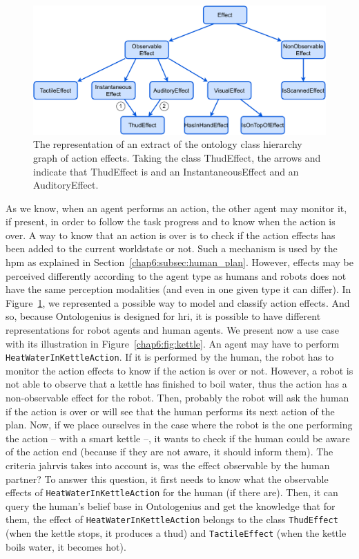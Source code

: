 \documentclass[a4paper,11pt,twoside]{StyleThese}
\begin{document}
\begin{figure}[!ht]
	\includegraphics[width=\linewidth]{figures/chapter2/class_effects.pdf}
	\caption{The representation of an extract of the ontology class hierarchy graph of action effects. Taking the class ThudEffect, the arrows  and  indicate that ThudEffect is and an InstantaneousEffect and an AuditoryEffect.}
	\label{chap6:fig:class_effects}
\end{figure}

As we know, when an agent performs an action, the other agent may monitor it, if present, in order to follow the task progress and to know when the action is over. A way to know that an action is over is to check if the action effects has been added to the current worldstate or not. Such a mechanism is used by the \acrlong{hpm} as explained in Section~\ref{chap6:subsec:human_plan}. However, effects may be perceived differently according to the agent type as humans and robots does not have the same perception modalities (and even in one given type it can differ). In Figure~\ref{chap6:fig:class_effects}, we represented a possible way to model and classify action effects. And so, because Ontologenius is designed for \acrshort{hri}, it is possible to have different representations for robot agents and human agents. We present now a use case with its illustration in Figure~\ref{chap6:fig:kettle}. An agent may have to perform \verb'HeatWaterInKettleAction'. If it is performed by the human, the robot has to monitor the action effects to know if the action is over or not. However, a robot is not able to observe that a kettle has finished to boil water, thus the action has a non-observable effect for the robot. Then, probably the robot will ask the human if the action is over or will see that the human performs its next action of the plan. Now, if we place ourselves in the case where the robot is the one performing the action -- with a smart kettle --, it wants to check if the human could be aware of the action end (because if they are not aware, it should inform them). The criteria \acrshort{jahrvis} takes into account is, was the effect observable by the human partner? To answer this question, it first needs to know what the observable effects of \verb'HeatWaterInKettleAction' for the human (if there are). Then, it can query the human's belief base in Ontologenius and get the knowledge that for them, the effect of \verb'HeatWaterInKettleAction' belongs to the class \verb'ThudEffect' (when the kettle stops, it produces a thud) and \verb'TactileEffect' (when the kettle boils water, it becomes hot).
	
\end{document}
